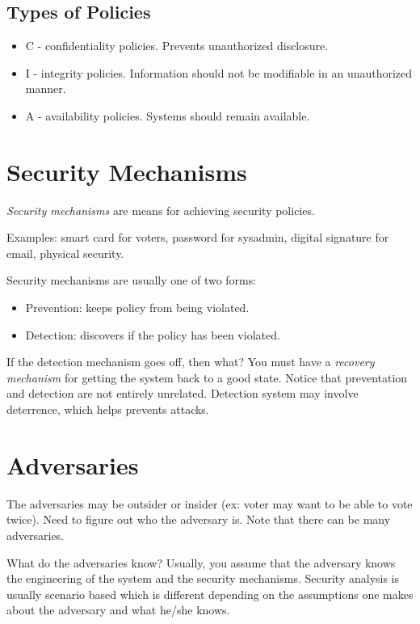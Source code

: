 \documentclass[psamsfonts]{amsart}
\begin{document}
\subsection{Types of Policies}

\begin{itemize}
\item C - confidentiality policies. Prevents unauthorized disclosure.
\item I - integrity policies. Information should not be modifiable in an unauthorized manner.
\item A - availability policies. Systems should remain available.
\end{itemize}

\section{Security Mechanisms}

\begin{def}
\emph{Security mechanisms} are means for achieving security policies.
\end{def}

Examples: smart card for voters, password for sysadmin, digital signature for email, physical security.

Security mechanisms are usually one of two forms:
\begin{itemize}
\item Prevention: keeps policy from being violated.
\item Detection: discovers if the policy has been violated.
\end{itemize}

If the detection mechanism goes off, then what? You must have a \emph{recovery mechanism} for getting the system back to a good state. Notice that preventation and detection are not entirely unrelated. Detection system may involve deterrence, which helps prevents attacks. 

\section{Adversaries}

The adversaries may be outsider or insider (ex: voter may want to be able to vote twice). Need to figure out who the adversary is. Note that there can be many adversaries. 

What do the adversaries know? Usually, you assume that the adversary knows the engineering of the system and the security mechanisms. Security analysis is usually scenario based which is different depending on the assumptions one makes about the adversary and what he/she knows.
\end{document}
